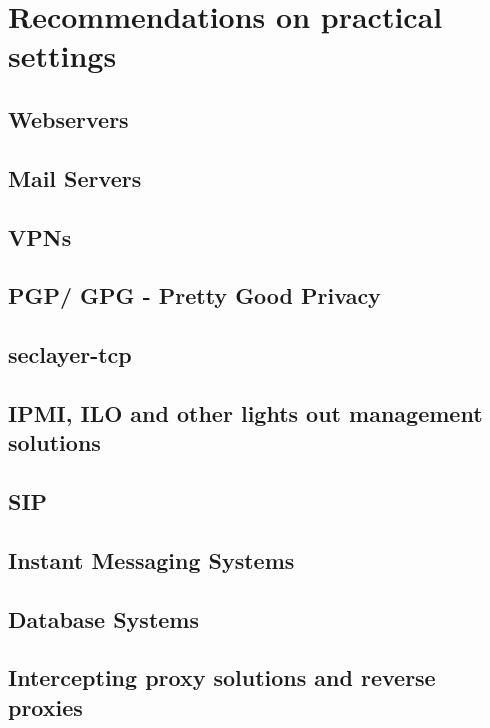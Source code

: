 \newpage
\section{Recommendations on practical settings}
\label{section:PracticalSettings}


\subsection{Webservers}



\subsection{Mail Servers}



\subsection{VPNs}



\subsection{PGP/ GPG - Pretty Good Privacy}



\subsection{seclayer-tcp}



\subsection{IPMI, ILO and other lights out management solutions}



\subsection{SIP}


\subsection{Instant Messaging Systems}



\subsection{Database Systems}



\subsection{Intercepting proxy solutions and reverse proxies}
 



